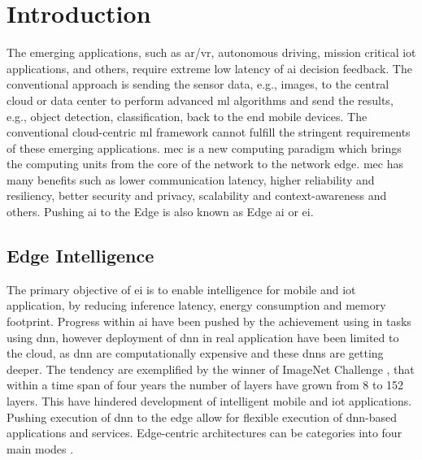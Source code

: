 \hypertarget{inroduction}{%
\chapter{Introduction}\label{sec:introduction}}
\thispagestyle{fancy}

The emerging applications, such as \gls{ar}/\gls{vr}, autonomous driving, mission critical \gls{iot} applications, and others, require extreme low latency of \gls{ai} decision feedback. The conventional approach is sending the sensor data, e.g., images, to the central cloud or data center to perform advanced \gls{ml} algorithms and send the results, e.g., object detection, classification, back to the end mobile devices. The conventional cloud-centric \gls{ml} framework cannot fulfill the stringent requirements of these emerging applications. \gls{mec} is a new computing paradigm which brings the computing units from the core of the network to the network edge. \gls{mec} has many benefits such as lower communication latency, higher reliability and resiliency, better security and privacy, scalability and context-awareness and others. Pushing \gls{ai} to the Edge is also known as Edge \gls{ai} or \gls{ei}.

\section{Edge Intelligence}

The primary objective of \gls{ei} is to enable intelligence for mobile and \gls{iot} application, by reducing inference latency, energy consumption and memory footprint. Progress within \gls{ai} have been pushed by the achievement using in tasks using \gls{dnn}, however deployment of \gls{dnn} in real application have been limited to the cloud, as \gls{dnn} are computationally expensive and these \gls{dnn}s are getting deeper. The tendency are exemplified by the winner of ImageNet Challenge \cite{russakovsky_imagenet_2015}, that within a time span of four years the number of layers have grown from 8 to 152 layers. This have hindered development of intelligent mobile and \gls{iot} applications. Pushing execution of \gls{dnn}  to the edge allow for flexible execution of \gls{dnn}-based applications and services. Edge-centric architectures can be categories into four main modes \cite{zhou_edge_2019}.

